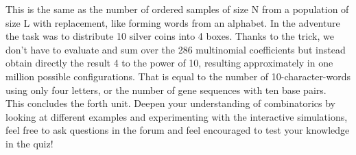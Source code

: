 \documentclass[12pt, a4paper]{scrartcl}
\begin{document}
This is the same as the number of ordered samples of size N from a population of size L with replacement, like forming words from an alphabet.
In the adventure the task was to distribute 10 silver coins into 4 boxes. Thanks to the trick, we don't have to evaluate and sum over the 286 multinomial coefficients but instead obtain directly the result 4 to the power of 10, resulting approximately in one million possible configurations.
That is equal to the number of 10-character-words using only four letters, 
or the number of gene sequences with ten base pairs.\\


This concludes the forth unit. Deepen your understanding of combinatorics by looking at different examples and experimenting with the interactive simulations, feel free to ask questions in the forum and feel encouraged to test your knowledge in the quiz!
\end{document}
